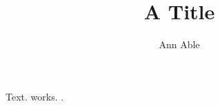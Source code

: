 \documentclass[sigconf]{acmart}
\title{A Title}
\author{Ann Able}
\begin{document}
\maketitle
{} Text.  works. \lxhooktext.
\end{document}
